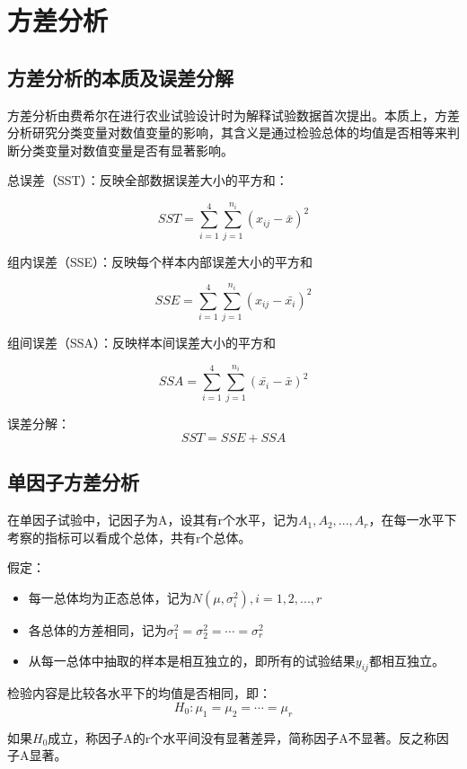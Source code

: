 \documentclass[
]{book}
\begin{document}
\section{方差分析}\label{ux65b9ux5deeux5206ux6790}

\subsection{方差分析的本质及误差分解}\label{ux65b9ux5deeux5206ux6790ux7684ux672cux8d28ux53caux8befux5deeux5206ux89e3}

方差分析由费希尔在进行农业试验设计时为解释试验数据首次提出。本质上，方差分析研究分类变量对数值变量的影响，其含义是通过检验总体的均值是否相等来判断分类变量对数值变量是否有显著影响。

总误差（SST）：反映全部数据误差大小的平方和：

\[
SST = \sum_{i=1}^4\sum_{j=1}^{n_i}(x_{ij}-\bar{x})^2
\]

组内误差（SSE）：反映每个样本内部误差大小的平方和

\[
SSE=\sum_{i=1}^4\sum_{j=1}^{n_i}(x_{ij}-\bar{x_i})^2
\]

组间误差（SSA）：反映样本间误差大小的平方和

\[
SSA=\sum_{i=1}^4\sum_{j=1}^{n_i}(\bar{x_i}-\bar{x})^2
\]

误差分解： \[
SST = SSE + SSA
\]

\subsection{单因子方差分析}\label{ux5355ux56e0ux5b50ux65b9ux5deeux5206ux6790}

在单因子试验中，记因子为A，设其有r个水平，记为\(A_1,A_2,...,A_r\)，在每一水平下考察的指标可以看成个总体，共有r个总体。

假定：

\begin{itemize}
\item
  每一总体均为正态总体，记为\(N(\mu,\sigma_i^2),i=1,2,...,r\)
\item
  各总体的方差相同，记为\(\sigma_1^2=\sigma_2^2=\cdots=\sigma_r^2\)
\item
  从每一总体中抽取的样本是相互独立的，即所有的试验结果\(y_{ij}\)都相互独立。
\end{itemize}

检验内容是比较各水平下的均值是否相同，即： \[
H_0:\mu_1=\mu_2=\cdots=\mu_r
\]

如果\(H_0\)成立，称因子A的r个水平间没有显著差异，简称因子A不显著。反之称因子A显著。
\end{document}
